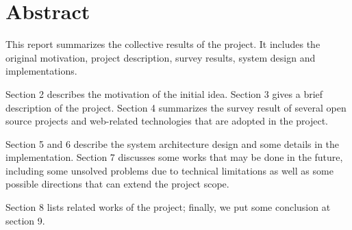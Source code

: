 \section{Abstract}

This report summarizes the collective results of the project. It includes the original motivation, project description, survey results, system design and implementations.

Section 2 describes the motivation of the initial idea.
Section 3 gives a brief description of the project.
Section 4 summarizes the survey result of several open source projects and web-related technologies that are adopted in the project.

Section 5 and 6 describe the system architecture design and some details in the implementation.
Section 7 discusses some works that may be done in the future, including some unsolved problems due to technical limitations as well as some possible directions that can extend the project scope.

Section 8 lists related works of the project; finally, we put some conclusion at section 9.